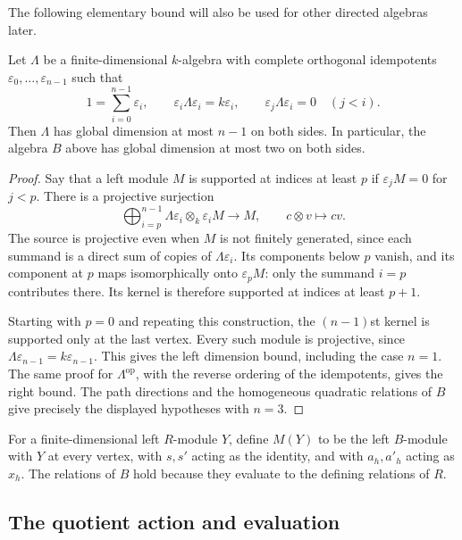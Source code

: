 The following elementary bound will also be used for other directed
algebras later.

\begin{lemma}\label{lem:directed-bound}
Let $\Lambda$ be a finite-dimensional $k$-algebra with complete
orthogonal idempotents $\varepsilon_0,\ldots,\varepsilon_{n-1}$ such that
\[
  1=\sum_{i=0}^{n-1}\varepsilon_i,\qquad
  \varepsilon_i\Lambda\varepsilon_i=k\varepsilon_i,\qquad
  \varepsilon_j\Lambda\varepsilon_i=0\quad(j<i).
\]
Then $\Lambda$ has global dimension at most $n-1$ on both sides.
In particular, the algebra $B$ above has global dimension at most two
on both sides.
\end{lemma}

\begin{proof}
Say that a left module $M$ is supported at indices at least $p$ if
$\varepsilon_jM=0$ for $j<p$.  There is a projective surjection
\[
  \bigoplus_{i=p}^{n-1}
      \Lambda\varepsilon_i\otimes_k\varepsilon_iM
      \longrightarrow M,
  \qquad c\otimes v\longmapsto cv.
\]
The source is projective even when $M$ is not finitely generated,
since each summand is a direct sum of copies of
$\Lambda\varepsilon_i$.  Its components below $p$ vanish, and its
component at $p$ maps isomorphically onto $\varepsilon_pM$:
only the summand $i=p$ contributes there.  Its kernel is therefore
supported at indices at least $p+1$.

Starting with $p=0$ and repeating this construction, the
$(n-1)$st kernel is supported only at the last vertex.  Every such
module is projective, since
$\Lambda\varepsilon_{n-1}=k\varepsilon_{n-1}$.
This gives the left dimension bound, including the case $n=1$.
The same proof for $\Lambda^{\mathrm{op}}$, with the reverse ordering
of the idempotents, gives the right bound.  The path directions and
the homogeneous quadratic relations of $B$ give precisely the
displayed hypotheses with $n=3$.
\end{proof}

For a finite-dimensional left $R$-module $Y$, define $M(Y)$ to be the
left $B$-module with $Y$ at every vertex, with $s,s'$ acting as the
identity, and with $a_h,a'_h$ acting as $x_h$.  The relations of $B$
hold because they evaluate to the defining relations of $R$.

\subsection{The quotient action and evaluation}

